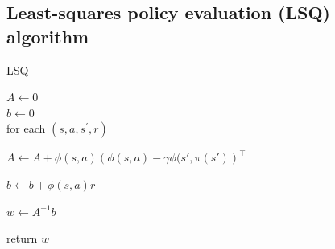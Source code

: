 \documentclass{article}
\newcommand{\lt}{\left}
\newcommand{\rt}{\right}
\begin{document}
{}

\begin{appendices}
\section{Least-squares policy evaluation (LSQ) algorithm}
\begin{algorithm}[H]
	\caption{LSQ}
	$A \leftarrow 0$ \\
	$b \leftarrow 0$ \\
	for each $(s,a, s^{\prime}, r)$
	
	\hspace{25pt} $A \leftarrow A + \phi(s,a)\lt(\phi(s,a) - \gamma \phi(s',\pi(s')\rt)^\intercal $
	
	\hspace{25pt} $b \leftarrow  b + \phi(s,a)r$
	
	$w	\leftarrow A^{-1}b$
	
	return $w$
\end{algorithm}
	
\end{appendices}
\end{document}
